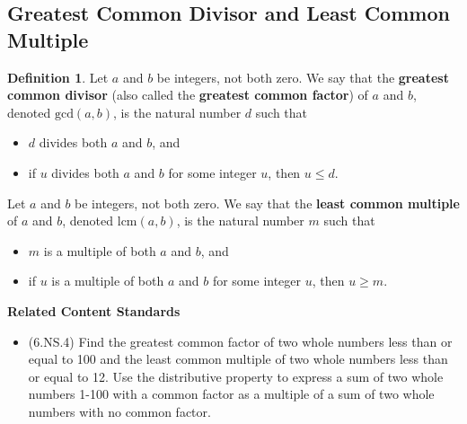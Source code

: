 \documentclass[
]{book}
\providecommand{\tightlist}{%
  \setlength{\itemsep}{0pt}\setlength{\parskip}{0pt}}
\newenvironment{standards}{}{}
\theoremstyle{definition}
\newtheorem{definition}{Definition}[chapter]
\theoremstyle{definition}
\theoremstyle{definition}
\theoremstyle{definition}
\theoremstyle{remark}
\begin{document}
\hypertarget{greatest-common-divisor-and-least-common-multiple}{%
\subsection{Greatest Common Divisor and Least Common Multiple}\label{greatest-common-divisor-and-least-common-multiple}}

\begin{definition}

Let \(a\) and \(b\) be integers, not both zero. We say that the \textbf{greatest common divisor} (also called the \textbf{greatest common factor}) of \(a\) and \(b\), denoted \(\mathrm{gcd}(a,b)\), is the natural number \(d\) such that

\begin{itemize}
\tightlist
\item
  \(d\) divides both \(a\) and \(b\), and
\item
  if \(u\) divides both \(a\) and \(b\) for some integer \(u\), then \(u\leq d\).
\end{itemize}

Let \(a\) and \(b\) be integers, not both zero. We say that the \textbf{least common multiple} of \(a\) and \(b\), denoted \(\mathrm{lcm}(a,b)\), is the natural number \(m\) such that

\begin{itemize}
\tightlist
\item
  \(m\) is a multiple of both \(a\) and \(b\), and
\item
  if \(u\) is a multiple of both \(a\) and \(b\) for some integer \(u\), then \(u\geq m\).
\end{itemize}

\end{definition}

\begin{standards}

\begin{center}
\textbf{Related Content Standards}

\end{center}

\begin{itemize}
\tightlist
\item
  (6.NS.4) Find the greatest common factor of two whole numbers less than or equal to 100 and the least common multiple of two whole numbers less than or equal to 12. Use the distributive property to express a sum of two whole numbers 1-100 with a common factor as a multiple of a sum of two whole numbers with no common factor.\\
\end{itemize}

\end{standards}
\end{document}
